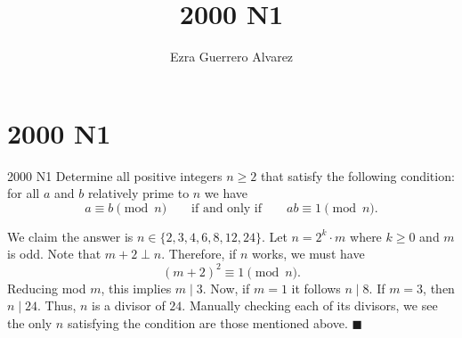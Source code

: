 \documentclass[14pt]{article}
\title{2000 N1}
\author{Ezra Guerrero Alvarez}
\begin{document}
\maketitle
	
\section*{2000 N1}

\begin{statement}{2000 N1}
	Determine all positive integers $ n\geq 2$ that satisfy the following condition: for all $ a$ and $ b$ relatively prime to $ n$ we have
	\[ a \equiv b \pmod n\qquad\text{if and only if}\qquad ab\equiv 1 \pmod n. \]
\end{statement}
We claim the answer is $n\in\{2,3,4,6,8,12,24\}$. Let $n=2^k\cdot m$ where $k\ge0$ and $m$ is odd. Note that $m+2\perp n$. Therefore, if $n$ works, we must have
\[ (m+2)^2\equiv1\pmod n.  \]
Reducing mod $m$, this implies $m\mid 3$. Now, if $m=1$ it follows $n\mid8$. If $m=3$, then $n\mid 24$. Thus, $n$ is a divisor of $24$. Manually checking each of its divisors, we see the only $n$ satisfying the condition are those mentioned above. $\blacksquare$ 
	
\end{document}

